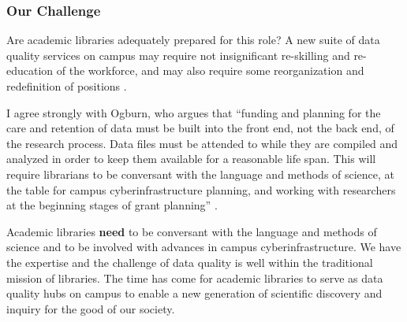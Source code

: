 \documentclass{acm_proc_article-sp}
\begin{document}
%

\subsubsection{Our Challenge}

Are academic libraries adequately prepared for this role?  A new suite
of data quality services on campus may require not insignificant
re-skilling and re-education of the workforce, and may also require
some reorganization and redefinition of positions \cite{jisc:deluge}.

%

%

I agree strongly with Ogburn, who argues that ``funding and planning
for the care and retention of data must be built into the front end,
not the back end, of the research process. Data files must be attended
to while they are compiled and analyzed in order to keep them
available for a reasonable life span. This will require librarians to
be conversant with the language and methods of science, at the table
for campus cyberinfrastructure planning, and working with researchers
at the beginning stages of grant planning''
\cite{ogburn:imperative}.

Academic libraries \textbf{need} to be conversant with the language
and methods of science and to be involved with advances in campus
cyberinfrastructure. We have the expertise and the challenge of data
quality is well within the traditional mission of libraries. The time
has come for academic libraries to serve as data quality hubs on
campus to enable a new generation of scientific discovery and inquiry
for the good of our society.
\end{document}
